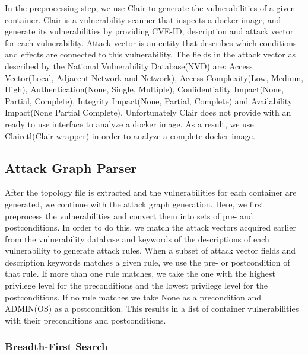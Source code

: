 In the preprocessing step, we use Clair to generate the vulnerabilities of a given container. Clair is a vulnerability scanner that inspects a docker image, and generate its vulnerabilities by providing CVE-ID, description and attack vector for each vulnerability. Attack vector is an entity that describes which conditions and effects are connected to this vulnerability. The fields in the attack vector as described by the National Vulnerability Database(NVD) \cite{booth2013national} are: Access Vector(Local, Adjacent Network and Network), Access Complexity(Low, Medium, High), Authentication(None, Single, Multiple), Confidentiality Impact(None, Partial, Complete), Integrity Impact(None, Partial, Complete) and Availability Impact(None Partial Complete). Unfortunately Clair does not provide with an ready to use interface to analyze a docker image. As a result, we use Clairctl(Clair wrapper) in order to analyze a complete docker image.
	
	
\subsection{Attack Graph Parser}

	
After the topology file is extracted and the vulnerabilities for each container are generated, we continue with the attack graph generation. Here, we first preprocess the vulnerabilities and convert them into sets of pre- and postconditions. In order to do this, we match the attack vectors acquired earlier from the vulnerability database and keywords of the descriptions of each vulnerability to generate attack rules. When a subset of attack vector fields and description keywords matches a given rule, we use the pre- or postcondition of that rule. If more than one rule matches, we take the one with the highest privilege level for the preconditions an\label{chap:attack_graph_p}d the lowest privilege level for the postconditions. If no rule matches we take None as a precondition and ADMIN(OS) as a postcondition. This results in a list of container vulnerabilities with their preconditions and postconditions.
	
\subsubsection{Breadth-First Search}
\label{chap:bfs}

